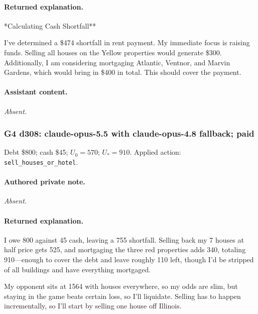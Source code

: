\paragraph{Returned explanation.}

{\small **Calculating Cash Shortfall**
\par
I've determined a \$474 shortfall in rent payment. My immediate focus is raising funds. Selling all houses on the Yellow properties would generate \$300. Additionally, I am considering mortgaging Atlantic, Ventnor, and Marvin Gardens, which would bring in \$400 in total. This should cover the payment.
\par

\par}

\paragraph{Assistant content.}

\textit{Absent.}

\medskip

\subsubsection*{G4 d308: claude-opus-5.5 with claude-opus-4.8 fallback; paid}

Debt \$800; cash \$45; $U_0=570$; $U_*=910$. Applied action: \texttt{sell\_houses\_or\_hotel}.

\paragraph{Authored private note.}

\textit{Absent.}

\paragraph{Returned explanation.}

{\small I owe 800 against 45 cash, leaving a 755 shortfall. Selling back my 7 houses at half price gets 525, and mortgaging the three red properties adds 340, totaling 910—enough to cover the debt and leave roughly 110 left, though I'd be stripped of all buildings and have everything mortgaged.
\par
My opponent sits at 1564 with houses everywhere, so my odds are slim, but staying in the game beats certain loss, so I'll liquidate. Selling has to happen incrementally, so I'll start by selling one house off Illinois.
\par
\par}

